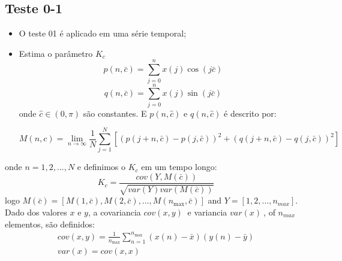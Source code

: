 \documentclass[12pt,aspectratio=169]{beamer}
\begin{document}
\subsection{Teste 0-1}
\begin{itemize}
    \item O teste 01 é aplicado em uma série temporal;
    \item Estima o parâmetro $K_c$
    \begin{equation} \label{eq:08t01} 
p\left(n,\bar{c}\right)=\sum _{j=0}^{n}x\left(j\right)\cos \left(j\bar{c}\right)  
\end{equation} 
\begin{equation} \label{eq:09t01} 
q\left(n,\bar{c}\right)=\sum _{j=0}^{n}x\left(j\right)\sin \left(j\bar{c}\right)  
\end{equation} 
\noindent onde $\hat{c}\in \left(0,\pi \right)$ são constantes. E $p\left(n,\hat{c}\right)$ e $q\left(n,\hat{c}\right)$ é descrito por: 

\begin{equation} \label{eq:10t01} 
M(n,c)={\mathop{\lim }\limits_{n\to \infty }} \frac{1}{N} \sum _{j=1}^{N}\left[\left(p(j+n,\bar{c})-p(j,\bar{c})\right)^{2} +\left(q(j+n,\bar{c})-q(j,\bar{c})\right)^{2} \right]  
\end{equation} 
\end{itemize}

\begin{frame}{}
\noindent onde $n=1,2,...,N$ e definimos o \textit{$K_{c}$} em um tempo longo:
\begin{equation} \label{eq:11t01} 
K_{c} =\frac{cov\left(Y,M(\bar{c})\right)}{\sqrt{var(Y)var(M(\bar{c}))} }  
\end{equation} 
\noindent logo $M(\bar{c})=\left[M(1,\bar{c}),M(2,\bar{c}),\ldots ,M(n_{\max } ,\bar{c})\right]$ and  $Y=\left[1,2,\dots ,n_{max}\right]$.
Dado dos valores $x$ e $y$, a covariancia ${cov \left(x,y\right)\ }$ e variancia ${var \left(x\right)\ }$, of $n_{max}$ elementos, são definidos:
\begin{equation} \label{eq:012t01} 
\begin{array}{l} {cov\left(x,y\right)=\frac{1}{n_{\max } } \sum _{n=1}^{n_{\max } }\left(x\left(n\right)-\bar{x}\right)\left(y\left(n\right)-\bar{y}\right) } \\ {var\left(x\right)=cov\left(x,x\right)} \end{array} 
\end{equation}
\end{frame}
\end{document}
